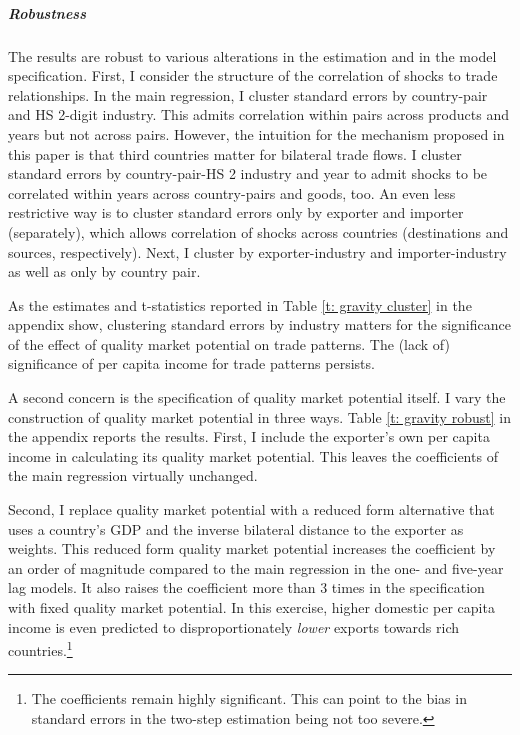 \documentclass[12pt,a4paper,oneside,times]{article}   	%
\begin{document}
\subparagraph{Robustness}
The results are robust to various alterations in the estimation and in the model specification. First, I consider the structure of the correlation of shocks to trade relationships. In the main regression, I cluster standard errors by country-pair and HS 2-digit industry. This admits correlation within pairs across products and years but not across pairs. However, the intuition for the mechanism proposed in this paper is that third countries matter for bilateral trade flows. I cluster standard errors by country-pair-HS 2 industry and year to admit shocks to be correlated within years across country-pairs and goods, too. An even less restrictive way is to cluster standard errors only by exporter and importer (separately), which allows correlation of shocks across countries (destinations and sources, respectively). Next, I cluster by exporter-industry and importer-industry as well as only by country pair. 

As the estimates and t-statistics reported in Table \ref{t: gravity cluster} in the appendix show, clustering standard errors by industry matters for the significance of the effect of quality market potential on trade patterns. The (lack of) significance of per capita income for trade patterns persists. 

A second concern is the specification of quality market potential itself. I vary the construction of quality market potential in three ways. Table \ref{t: gravity robust} in the appendix reports the results. First, I include the exporter's own per capita income in calculating its quality market potential. This leaves the coefficients of the main regression virtually unchanged. 

Second, I replace quality market potential with a reduced form alternative that uses a country's GDP and the inverse bilateral distance to the exporter as weights. This reduced form quality market potential increases the coefficient by an order of magnitude compared to the main regression in the one- and five-year lag models. It also raises the coefficient more than 3 times in the specification with fixed quality market potential.  In this exercise, higher domestic per capita income is even predicted to disproportionately \emph{lower} exports towards rich countries.\footnote{The coefficients remain highly significant. This can point to the bias in standard errors in the two-step estimation being not too severe.} 
\end{document}

